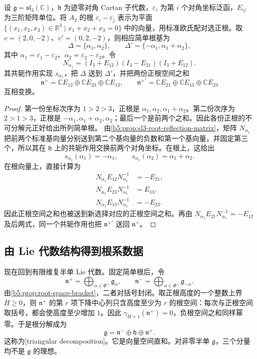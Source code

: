 \begin{proposition}\label{b5:prop:a2-positive-system-conjugation}
	设 \(\mathfrak g=\mathfrak{sl}_3(\mathbb C)\)，\(\mathfrak h\) 为迹零对角 Cartan 子代数，\(\varepsilon_i\) 为第 \(i\) 个对角坐标泛函，\(E_{ij}\) 为三阶矩阵单位。将 \(A_2\) 的根 \(\varepsilon_i-\varepsilon_j\) 表示为平面 \(\{(x_1,x_2,x_3)\in\mathbb R^3\mid x_1+x_2+x_3=0\}\) 中的向量，用标准欧氏配对选正根。取 \(v=(2,0,-2)\)、\(v'=(0,2,-2)\)，则相应简单根基为
	\[
		\Delta=\{\alpha_1,\alpha_2\},\qquad \Delta'=\{-\alpha_1,\alpha_1+\alpha_2\},
	\]
	其中 \(\alpha_1=\varepsilon_1-\varepsilon_2\)、\(\alpha_2=\varepsilon_2-\varepsilon_3\)。令
	\[
		N_{\alpha_1}=(I_3+E_{12})(I_3-E_{21})(I_3+E_{12}).
	\]
	其共轭作用实现 \(s_{\alpha_1}\)，把 \(\Delta\) 送到 \(\Delta'\)，并把两份正根空间之和
	\[
		\mathfrak n^+=\mathbb CE_{12}\oplus\mathbb CE_{23}\oplus\mathbb CE_{13}, \qquad \mathfrak n^{+\prime}=\mathbb CE_{21}\oplus\mathbb CE_{13}\oplus\mathbb CE_{23}
	\]
	互相变换。
\end{proposition}
\begin{proof}
	第一份坐标次序为 \(1>2>3\)，正根是 \(\alpha_1,\alpha_2,\alpha_1+\alpha_2\)。第二份次序为 \(2>1>3\)，正根是 \(-\alpha_1,\alpha_1+\alpha_2,\alpha_2\)；最后一个是前两个之和。因此各份正根的不可分解元正好给出所列简单根。 由\cref{b5:prop:sl3-root-reflection-matrix}，矩阵 \(N_{\alpha_1}\) 把前两个标准基向量分别送到第二个基向量的负数和第一个基向量，并固定第三个，所以其在 \(\mathfrak h\) 上的共轭作用交换前两个对角坐标。在根上，这给出
	\[
		s_{\alpha_1}(\alpha_1)=-\alpha_1,\qquad s_{\alpha_1}(\alpha_2)=\alpha_1+\alpha_2.
	\]
	在根向量上，直接计算为
	\[
		\begin{aligned}
			N_{\alpha_1}E_{12}N_{\alpha_1}^{-1}&=-E_{21},\\
			N_{\alpha_1}E_{23}N_{\alpha_1}^{-1}&=E_{13},\\
			N_{\alpha_1}E_{13}N_{\alpha_1}^{-1}&=-E_{23}.
		\end{aligned}
	\]
	因此正根空间之和也被送到新选择对应的正根空间之和。再由 \(N_{\alpha_1}E_{21}N_{\alpha_1}^{-1}=-E_{12}\) 及后两式，同一个共轭作用也把 \(\mathfrak n^{+\prime}\) 送回 \(\mathfrak n^+\)。
\end{proof}

\subsection{由 Lie 代数结构得到根系数据}
\label{b5:subsec:1604:03}

现在回到有限维复半单 Lie 代数。固定简单根后，令
\[
	\mathfrak n^+=\bigoplus_{\alpha\in\Phi^+}\mathfrak g_\alpha, \qquad \mathfrak n^-=\bigoplus_{\alpha\in\Phi^+}\mathfrak g_{-\alpha}.
\]
由\cref{b5:prop:root-space-bracket}，二者对括号封闭。取正根高度的一个整数上界 \(H\ge0\)，则 \(\mathfrak n^+\) 的第 \(r\) 项下降中心列只含高度至少为 \(r\) 的根空间：每次与正根空间取括号，都会使高度至少增加 \(1\)。因此 \(\gamma_{H+1}(\mathfrak n^+)=0\)，负根空间之和同样幂零。于是根分解成为
\begin{equation}\label{b5:eq:triangular-decomposition}
	\mathfrak g=\mathfrak n^-\oplus\mathfrak h\oplus\mathfrak n^+.
\end{equation}
这称为[triangular decomposition]。它是向量空间直和。对非零半单 \(\mathfrak g\)，三个分量均不是 \(\mathfrak g\) 的理想。

